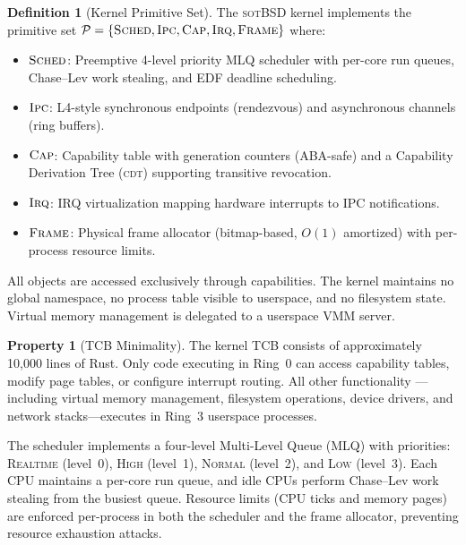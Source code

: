 \documentclass[11pt,a4paper]{article}
\theoremstyle{definition}
\newtheorem{definition}{Definition}[section]
\newtheorem{property}{Property}[section]
\theoremstyle{remark}
\newcommand{\sotbsd}{\textsc{sotBSD}}
\newcommand{\CDT}{\textsc{cdt}}
\begin{document}
\begin{definition}[Kernel Primitive Set]
\label{def:primitives}
The \sotbsd{} kernel implements the primitive set
$\mathcal{P} = \{\textsc{Sched}, \textsc{Ipc}, \textsc{Cap},
\textsc{Irq}, \textsc{Frame}\}$ where:
\begin{itemize}[leftmargin=1.4em]
\item $\textsc{Sched}$: Preemptive 4-level priority MLQ scheduler
  with per-core run queues, Chase--Lev work stealing, and EDF
  deadline scheduling.
\item $\textsc{Ipc}$: L4-style synchronous endpoints (rendezvous)
  and asynchronous channels (ring buffers).
\item $\textsc{Cap}$: Capability table with generation counters
  (ABA-safe) and a Capability Derivation Tree (\CDT{}) supporting
  transitive revocation.
\item $\textsc{Irq}$: IRQ virtualization mapping hardware interrupts
  to IPC notifications.
\item $\textsc{Frame}$: Physical frame allocator (bitmap-based,
  $O(1)$ amortized) with per-process resource limits.
\end{itemize}
\end{definition}

All objects are accessed exclusively through capabilities. The kernel
maintains no global namespace, no process table visible to userspace,
and no filesystem state. Virtual memory management is delegated to a
userspace VMM server.

\begin{property}[TCB Minimality]
\label{prop:tcb}
The kernel TCB consists of approximately 10{,}000 lines of Rust.
Only code executing in Ring~0 can access capability tables, modify
page tables, or configure interrupt routing. All other functionality
---including virtual memory management, filesystem operations, device
drivers, and network stacks---executes in Ring~3 userspace processes.
\end{property}

The scheduler implements a four-level Multi-Level Queue (MLQ) with
priorities: \textsc{Realtime} (level~0), \textsc{High} (level~1),
\textsc{Normal} (level~2), and \textsc{Low} (level~3). Each CPU
maintains a per-core run queue, and idle CPUs perform Chase--Lev
work stealing from the busiest queue. Resource limits (CPU ticks
and memory pages) are enforced per-process in both the scheduler
and the frame allocator, preventing resource exhaustion attacks.
\end{document}
